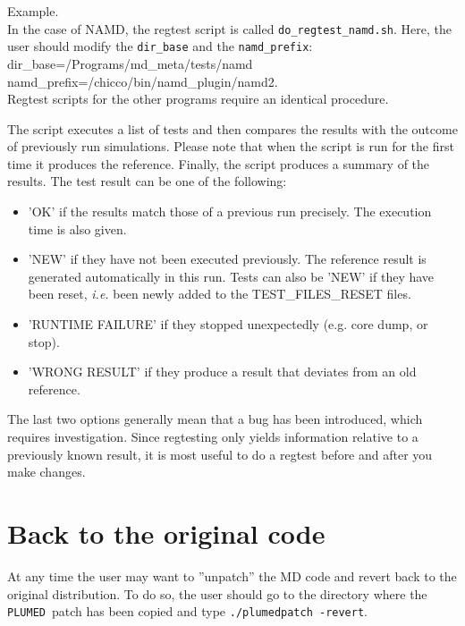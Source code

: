 \documentclass[12pt,fleqn]{report}
\newcommand{\plumed}{{\tt PLUMED}}
\newcommand{\esempio}[1]{
\vspace{10pt}
\begin{flushright}
\colorbox{light-gray}{
   \begin{minipage}{13cm}
       \scriptsize{
{\fontfamily{phv} \fontseries{b}
 \selectfont Example. \\
 \fontseries{m} \selectfont #1 } }
\end{minipage}}
\end{flushright}
\vspace{20pt}
}
\begin{document}
\esempio{In the case of NAMD, the regtest script is called 
{\tt  do\_regtest\_namd.sh}. Here, the user should modify the {\tt dir\_base} and the {\tt \tt namd\_prefix}: \vspace{10pt} \\
dir\_base=/Programs/md\_meta/tests/namd \\
 namd\_prefix=/chicco/bin/namd\_plugin/namd2. \\

Regtest scripts for the other programs require an identical procedure.

}

The script executes a list of tests and then compares the results
with the outcome of previously run simulations.
Please note that when the script is run for the 
first time it produces the reference. Finally, the script produces a summary of the results.
The test result can be one of the following:
\begin{itemize}
\item 'OK' if the results match those of a previous run precisely. The execution time is also given.
\item'NEW' if they have not been executed previously. The reference result is generated
      automatically in this run. Tests can also be 'NEW' if they have been reset, \emph{i.e.} been newly
      added to the TEST\_FILES\_RESET files.
\item 'RUNTIME FAILURE' if they stopped unexpectedly (e.g. core dump, or stop).
\item 'WRONG RESULT' if they produce a result that deviates from an old reference.
\end{itemize}
  
  The last two options generally mean that a bug has been introduced, which requires investigation.
  Since regtesting only yields information relative to a previously known result, it is most useful
  to do a regtest before and after you make changes.

\section{Back to the original code}

At any time the user may want to ''unpatch'' the MD code and revert back to
the original distribution. 
To do so, the user should go to the directory where the \plumed \ patch has been copied and type {\tt ./plumedpatch -revert}.  
\end{document}
